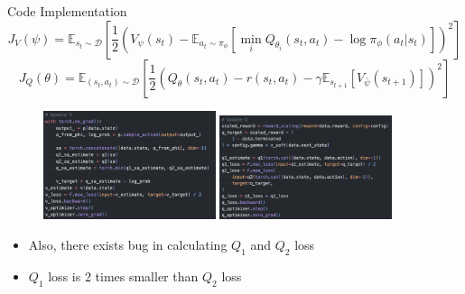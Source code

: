 \documentclass[8pt]{beamer}
\begin{document}
\begin{frame}{Code Implementation}
    \begin{equation*}
        J_V(\psi) = \mathbb{E}_{s_t \sim \mathcal{D}} \left[ \frac{1}{2} \left(V_\psi (s_t) - \mathbb{E}_{a_t \sim \pi_\phi}[\min_i Q_{\theta_i}(s_t, a_t) - \log{\pi_\phi (a_t | s_t)}]\right)^2 \right]
    \end{equation*}
    \begin{equation*}
        J_Q(\theta) = \mathbb{E}_{(s_t,a_t) \sim \mathcal{D}} \left[ \frac{1}{2} \left(Q_\theta (s_t, a_t) - r(s_t,a_t) - \gamma \mathbb{E}_{s_{t+1}}[V_{\bar{\psi}}(s_{t+1})] \right)^2\right]
    \end{equation*}
    \begin{figure}
        \centering
        \includegraphics[width=0.45\textwidth]{fig4.png}
        \includegraphics[width=0.45\textwidth]{fig5.png}
    \end{figure}

    \begin{itemize}
        \item Also, there exists bug in calculating $Q_1$ and $Q_2$ loss
        \item $Q_1$ loss is 2 times smaller than $Q_2$ loss
    \end{itemize}
\end{frame}
\end{document}
